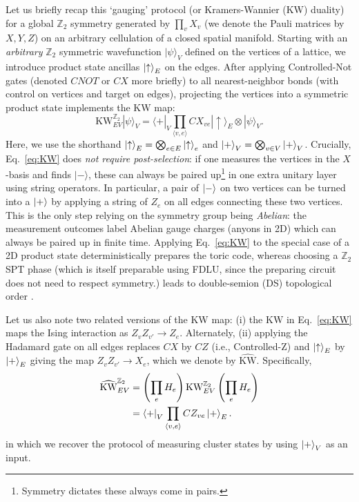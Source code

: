 \documentclass[nofootinbib,prx,twocolumn,showpacs,superscriptaddress,notitlepage,amsmath,amssymb]{revtex4-2}
\theoremstyle{definition}
\def\KW{\text{KW}}
\def\KWd{\widehat{\text{KW}}}
\def\bra#1{\mathinner{\langle{#1}|}}
\def\ket#1{\mathinner{|{#1}\rangle}}
\def\ZZ{\mathbb Z}
\begin{document}
Let us briefly recap this `gauging' protocol (or Kramers-Wannier (KW) duality) for a global $\mathbb Z_2$ symmetry generated by $\prod_v X_v$ (we denote the Pauli matrices by $X,Y,Z$) on an arbitrary cellulation of a closed spatial manifold. Starting with an \emph{arbitrary} $\ZZ_2$ symmetric wavefunction $|\psi\rangle_V$ defined on the vertices of a lattice, we introduce product state ancillas $\ket{\uparrow}_E$ on the edges. After applying Controlled-Not gates (denoted $CNOT$ or $CX$ more briefly) to all nearest-neighbor bonds (with control on vertices and target on edges), projecting the vertices into a symmetric product state implements the KW map: 
\begin{equation}
\KW_{EV}^{\mathbb Z_2} |\psi\rangle_V = \langle +|_V \prod_{\langle v,e\rangle} CX_{ve} |\uparrow\rangle_{E} \otimes |\psi\rangle_V. \label{eq:KW}
\end{equation}
Here, we use the shorthand $\ket{\uparrow}_E = \bigotimes_{e\in E}\ket{\uparrow}_e$ and  $\ket{+}_V = \bigotimes_{v\in V}\ket{+}_V$.  Crucially, Eq.~\eqref{eq:KW} does \emph{not require post-selection}: if one measures the vertices in the $X$-basis and finds $|-\rangle$, these can always be paired up\footnote{Symmetry dictates these always come in pairs.} in one extra unitary layer using string operators. In particular, a pair of $\ket{-}$ on two vertices can be turned into a $\ket{+}$ by applying a string of $Z_e$ on all edges connecting these two vertices. This is the only step relying on the symmetry group being \emph{Abelian}: the measurement outcomes label Abelian gauge charges (anyons in 2D) which can always be paired up in finite time. Applying Eq.~\eqref{eq:KW} to the special case of a 2D product state deterministically prepares the toric code, whereas choosing a $\mathbb Z_2$ SPT phase \cite{Levin_2012} (which is itself preparable using FDLU, since the preparing circuit does not need to respect symmetry.) leads to double-semion (DS) topological order \cite{measureSPT}.

Let us also note two related versions of the KW map: (i) the $\KW$ in Eq.~\eqref{eq:KW} maps the Ising interaction as $Z_v Z_{v'} \to Z_e$. Alternately, (ii) applying the Hadamard gate on all edges replaces $CX$ by $CZ$ (i.e., Controlled-Z) and $\ket{\uparrow}_E$ by $\ket{+}_E$ giving the map $Z_v Z_{v'} \to X_e$, which we denote by $\KWd$. Specifically,
\begin{align}
    \KWd_{EV}^{\mathbb Z_2} &= \left(\prod_e H_e \right) \KW _{EV}^{\mathbb Z_2} \left( \prod_e H_e\right) \\ &= \bra{+}_V\prod_{\langle v,e\rangle} CZ_{ve} \ket{+}_{E}.
\end{align}
in which we recover the protocol of measuring cluster states by using $\ket{+}_V$ as an input.
\end{document}
